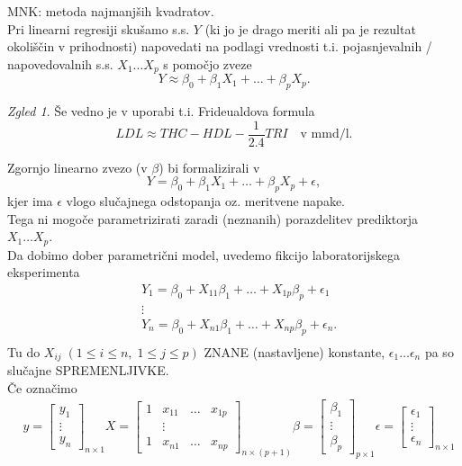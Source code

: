 \documentclass[a4paper, 12pt]{book}
\theoremstyle{definition}
\theoremstyle{remark}
\newtheorem*{exmp}{Zgled}
\begin{document}
MNK: metoda najmanjših kvadratov. \\
Pri linearni regresiji skušamo  s.s. $Y$
(ki jo je drago meriti ali pa je rezultat okoliščin v prihodnosti)
napovedati na podlagi vrednosti  t.i. pojasnjevalnih / napovedovalnih s.s. $X_1 \dots X_p$
s pomočjo zveze
\begin{equation*}
  Y \approx \beta_0 + \beta_1 X_1 + \dots + \beta_p X_p.
\end{equation*}
\begin{exmp}
  Še vedno je v uporabi t.i. Frideualdova formula
  \begin{equation*}
    LDL \approx THC - HDL - \frac{1}{2.4} TRI \quad \text{v mmd/l}.
  \end{equation*}
\end{exmp}
Zgornjo linearno zvezo (v $\beta$) bi formalizirali v
\begin{equation*}
  Y = \beta_0 + \beta_1 X_1 + \dots + \beta_p X_p + \epsilon,
\end{equation*}
kjer ima $\epsilon$ vlogo slučajnega odstopanja oz. meritvene napake. \\
Tega  ni mogoče parametrizirati zaradi (neznanih) porazdelitev prediktorja $X_1 \dots X_p$. \\
Da dobimo dober parametrični model, uvedemo fikcijo laboratorijskega eksperimenta
\begin{align*}
  &Y_1 = \beta_0 + X_{11} \beta_1 + \dots + X_{1p} \beta_p + \epsilon_1 \\
  &\vdots \\
  &Y_n = \beta_0 + X_{n1} \beta_1 + \dots + X_{np} \beta_p + \epsilon_n. \\
\end{align*}
Tu do $X_{ij} \; (1 \leq i \leq n, \; 1 \leq j \leq p)$ ZNANE (nastavljene) konstante,
$\epsilon_1 \dots \epsilon_n$ pa so slučajne SPREMENLJIVKE. \\
Če označimo
\begin{align*}
  &y = \begin{bmatrix}
    y_1 \\
    \vdots \\
    y_n
    \end{bmatrix}_{n \times 1}
  X = \begin{bmatrix}
    1 & x_{11} & \dots & x_{1p} \\
    & \vdots & & \\
    1 & x_{n1} & \dots & x_{np}
    \end{bmatrix}_{n \times (p+1)}
  \beta = \begin{bmatrix}
    \beta_1 \\
    \vdots \\
    \beta_p
    \end{bmatrix}_{p \times 1}
  \epsilon = \begin{bmatrix}
    \epsilon_1 \\
    \vdots \\
    \epsilon_n
  \end{bmatrix}_{n \times 1}
\end{align*}
\end{document}
